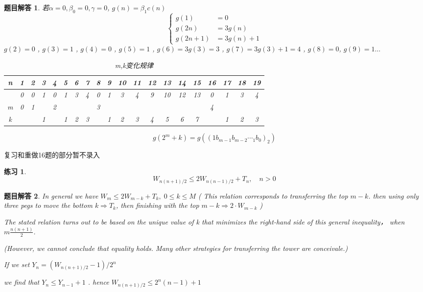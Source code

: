 \documentclass[mode=geye]{elegantnote}
\newtheorem{exercise}{练习}
\newtheorem{answer}{题目解答}
\begin{document}
\begin{answer}
若$ \alpha=0,\beta_0=0, \gamma=0 $, $ g(n)=\beta_1 c(n) $  
\begin{equation*}
	\left\{
		\begin{aligned}
			g(1)&=0\\
			g(2n)&=3g(n)\\
			g(2n+1)&=3g(n)+1
		\end{aligned}
	\right.
\end{equation*}
$ g(2)=0 $ , $ g(3)=1 $ , $ g(4)=0 $ , $ g(5)=1 $ , 
$ g(6)=3g(3)=3 $ , $ g(7)=3g(3)+1=4 $ , $ g(8)=0 $, $ g(9)=1 \dots$  

\begin{table}[htbp]
	\centering
	\small
	\caption{m,k变化规律}
	\begin{tabular}{c|ccccc ccccc ccccc cccc}
		\toprule
		n & 1 & 2 & 3 & 4 & 5 & 6 & 7 & 8 & 9 & 10 & 11 & 12 & 13 & 14 & 15 & 16 & 17 & 18 & 19 \\
		\midrule
		& 0 & 0 & 1 & 0 & 1 & 3 & 4 & 0 & 1 & 3  & 4  & 9  & 10 & 12 & 13 & 0  & 1  & 3  & 4  \\
		m & 0 & 1 &   & 2 &   &   &   & 3 &   &    &    &    &    &    & & 4  &    &    &    \\  
		k& &   & 1 &   & 1 & 2 & 3 &   & 1 & 2  & 3  & 4  & 5  & 6  & 7 &   & 1  & 2  & 3 \\
		\bottomrule
	\end{tabular}%
	\label{tab:EX16}%
\end{table}%
\begin{equation*}
	g(2^{m}+k)=g(\left( 1 b_{m-1}b_{m-2}\dotsb_1b_0 \right)_2)
\end{equation*}
\end{answer}

复习和重做16题的部分暂不录入


\begin{exercise} 
	\begin{equation*}
		W_{n(n+1)/2} \leqslant 2W_{n(n-1)/2}+T_n, \quad n>0
	\end{equation*}
\end{exercise}

\begin{answer}
	In general we have $ W_m\leqslant 2W_{m-k}+T_k, \; 0\leqslant k \leqslant M $ 
( This relation corresponds to transferring the top $ m-k $. 
then using only three pegs to move the bottom $ k\Rightarrow T_k $, then finishing with the top $ m-k \Rightarrow 2\cdot W_{m-k} $ )

The stated relation turns out to be based on the unique value of k that minimizes the right-hand side of this general inequality， when $ m\frac{n(n+1)}{2} $.

(However, we cannot conclude that equality holds. Many other
strategies for transferring the tower are conceivale.)

If we set $ Y_n = (W_{n(n+1)/2}-1)/2^n $ 

we find that $ Y_n \leqslant Y_{n-1}+1 $ . 
hence $ W_{n(n+1)/2} \leqslant 2^n(n-1)+1 $ 
\end{answer}
\end{document}
